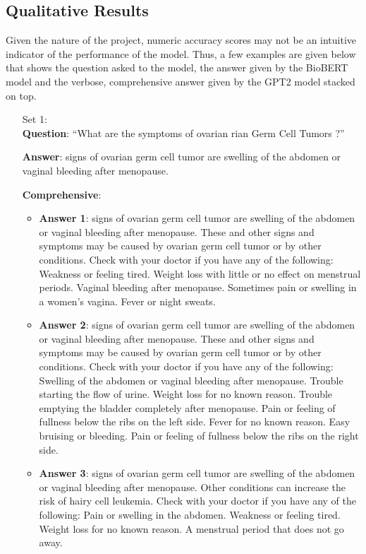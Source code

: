 	\subsection*{Qualitative Results}
		Given the nature of the project, numeric accuracy scores may not be an intuitive indicator of the performance of the model. Thus, a few examples are given below that shows the question asked to the model, the answer given by the BioBERT model and the verbose, comprehensive answer given by the GPT2 model stacked on top.
		
		\begin{enumerate}
			\item[Set 1:]\qquad\\
				\textbf{Question}: ``What are the symptoms of ovarian rian Germ Cell Tumors ?''
				
				\textbf{Answer}: signs of ovarian germ cell tumor are swelling of the abdomen or vaginal bleeding after menopause.
				
				\textbf{Comprehensive}: 
					\begin{itemize}
						\item \textbf{Answer 1}: signs of ovarian germ cell tumor are swelling of the abdomen or vaginal bleeding after menopause. These and other signs and symptoms may be caused by ovarian germ cell tumor or by other conditions. Check with your doctor if you have any of the following: Weakness or feeling tired. Weight loss with little or no effect on menstrual periods. Vaginal bleeding after menopause. Sometimes pain or swelling in a women's vagina. Fever or night sweats.
						
						\item \textbf{Answer 2}: signs of ovarian germ cell tumor are swelling of the abdomen or vaginal bleeding after menopause. These and other signs and symptoms may be caused by ovarian germ cell tumor or by other conditions. Check with your doctor if you have any of the following: Swelling of the abdomen or vaginal bleeding after menopause. Trouble starting the flow of urine. Weight loss for no known reason. Trouble emptying the bladder completely after menopause. Pain or feeling of fullness below the ribs on the left side. Fever for no known reason. Easy bruising or bleeding. Pain or feeling of fullness below the ribs on the right side.
						
						\item \textbf{Answer 3}: signs of ovarian germ cell tumor are swelling of the abdomen or vaginal bleeding after menopause. Other conditions can increase the risk of hairy cell leukemia. Check with your doctor if you have any of the following: Pain or swelling in the abdomen. Weakness or feeling tired. Weight loss for no known reason. A menstrual period that does not go away.
						

\end{itemize}
\end{enumerate}
